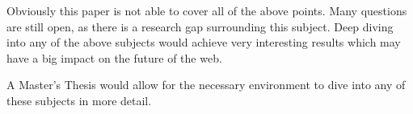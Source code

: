 Obviously this paper is not able to cover all of the above points. Many questions are still open, as there is a research gap surrounding this subject. Deep diving into any of the above subjects would achieve very interesting results which may have a big impact on the future of the web.

A Master's Thesis would allow for the necessary environment to dive into any of these subjects in more detail.